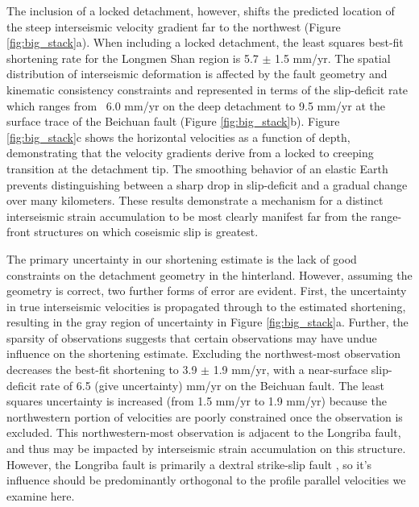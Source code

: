 \documentclass[draft,jgrga]{agutex}
\begin{document}
\begin{article}
The inclusion of a locked detachment, however, shifts the predicted location of the steep interseismic velocity gradient far to the northwest (Figure \ref{fig:big_stack}a). When including a locked detachment, the least squares best-fit shortening rate for the Longmen Shan region is 5.7 $\pm$ 1.5 mm/yr. The spatial distribution of interseismic deformation is affected by the fault geometry and kinematic consistency constraints and represented in terms of the slip-deficit rate which ranges from ~6.0 mm/yr on the deep detachment to 9.5 mm/yr at the surface trace of the Beichuan fault (Figure \ref{fig:big_stack}b). Figure \ref{fig:big_stack}c shows the horizontal velocities as a function of depth, demonstrating that the velocity gradients derive from a locked to creeping transition at the detachment tip. The smoothing behavior of an elastic Earth prevents distinguishing between a sharp drop in slip-deficit and a gradual change over many kilometers. These results demonstrate a mechanism for a distinct interseismic strain accumulation to be most clearly manifest far from the range-front structures on which coseismic slip is greatest.

The primary uncertainty in our shortening estimate is the lack of good constraints on the detachment geometry in the hinterland. However, assuming the geometry is correct, two further forms of error are evident. First, the uncertainty in true interseismic velocities is propagated through to the estimated shortening, resulting in the gray region of uncertainty in Figure \ref{fig:big_stack}a. Further, the sparsity of observations suggests that certain observations may have undue influence on the shortening estimate. Excluding the northwest-most observation decreases the best-fit shortening to 3.9 $\pm$ 1.9 mm/yr, with a near-surface slip-deficit rate of 6.5 (give uncertainty) mm/yr on the Beichuan fault. The least squares uncertainty is increased (from 1.5 mm/yr to 1.9 mm/yr) because the northwestern portion of velocities are poorly constrained once the observation is excluded. This northwestern-most observation is adjacent to the Longriba fault, and thus may be impacted by interseismic strain accumulation on this structure. However, the Longriba fault is primarily a dextral strike-slip fault \citep{Ren2013}, so it's influence should be predominantly orthogonal to the profile parallel velocities we examine here.


\end{article}
\end{document}
